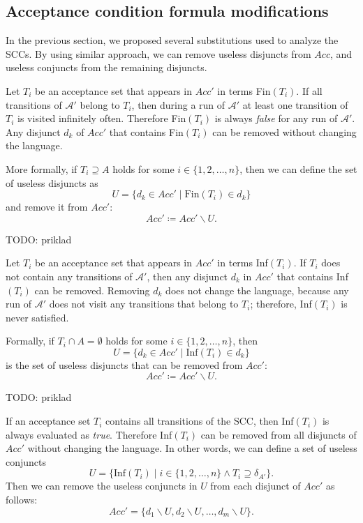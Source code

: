 \documentclass[
  digital, %
  twoside, %
  table,   %
  lof,     %
  lot,     %
]{fithesis3}
\begin{document}
\subsection{Acceptance condition formula modifications}
In the previous section, we proposed several substitutions used to analyze the SCCs. By using similar approach, we can remove useless disjuncts from $Acc$, and useless conjuncts from the remaining disjuncts.

Let $T_i$ be an acceptance set that appears in $Acc'$ in terms Fin$(T_i)$. If all transitions of $\mathcal{A'}$ belong to $T_i$, then during a run of $\mathcal{A'}$ at least one transition of $T_i$ is visited infinitely often. Therefore Fin$(T_i)$ is always \emph{false} for any run of $\mathcal{A'}$. Any disjunct $d_k$ of $Acc'$ that contains Fin$(T_i)$ can be removed without changing the language.

More formally, if $T_i \supseteq A$ holds for some $i \in \{1,2, \dots, n\}$, then we can define the set of useless disjuncts as
\begin{equation*}
  U = \{d_k \in Acc' \mid \text{Fin}(T_i) \in d_k \}
\end{equation*}
and remove it from $Acc'$:
\begin{equation*}
  Acc' \coloneqq Acc' \smallsetminus U.
\end{equation*}

TODO: priklad

Let $T_i$ be an acceptance set that appears in $Acc'$ in terms Inf$(T_i)$. If $T_i$ does not contain any transitions of $\mathcal{A'}$, then any disjunct $d_k$ in $Acc'$ that contains Inf$(T_i)$ can be removed. Removing $d_k$ does not change the language, because any run of $\mathcal{A'}$ does not visit any transitions that belong to $T_i$; therefore, Inf$(T_i)$ is never satisfied.

Formally, if $T_i \cap A = \emptyset$ holds for some $i \in \{1,2, \dots, n\}$, then 
\begin{equation*}
  U = \{d_k \in Acc' \mid \text{Inf}(T_i) \in d_k \}
\end{equation*}
is the set of useless disjuncts that can be removed from $Acc'$:
\begin{equation*}
  Acc' \coloneqq Acc' \smallsetminus U.
\end{equation*}

TODO: priklad

If an acceptance set $T_i$ contains all transitions of the SCC, then Inf$(T_i)$ is always evaluated as \emph{true}. Therefore Inf$(T_i)$ can be removed from all disjuncts of $Acc'$ without changing the language. 
In other words, we can define a set of useless conjuncts 
\begin{equation*}
  U = \{\text{Inf}(T_i) \mid i \in \{1,2, \dots, n\} \wedge T_i \supseteq \delta_{A'}\}.
\end{equation*}
Then we can remove the useless conjuncts in $U$ from each disjunct of $Acc'$ as follows:
\begin{equation*}
  Acc' = \{d_1 \smallsetminus U, d_2 \smallsetminus U, \dots, d_m \smallsetminus U\}.
\end{equation*}
\end{document}
